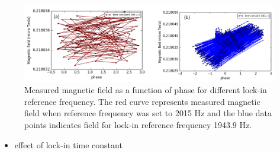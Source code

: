  \begin{figure}[h]
\centering\includegraphics[width=0.8\linewidth]{figures/phase}
\caption{Measured magnetic field as a function of phase for different lock-in reference frequency. The red curve represents measured magnetic field when reference frequency was set to 2015 Hz and the blue data points indicates field for lock-in reference frequency 1943.9 Hz.}
\end{figure} 

 \begin{itemize}
   \item effect of lock-in time constant
   

\end{itemize}

